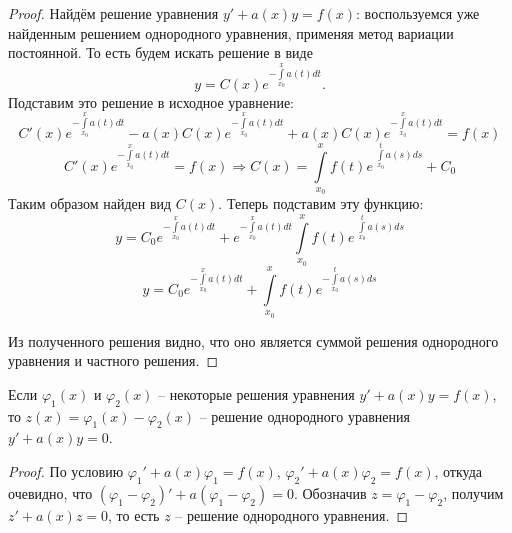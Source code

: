 \begin{proof}
    Найдём решение уравнения $y' + a(x) y = f(x)$: воспользуемся уже найденным решением однородного уравнения, применяя метод вариации постоянной. То есть будем искать решение в виде
    \begin{equation}
        y = C(x) e^{-\int\limits_{x_0}^{x} a(t) dt}.
    \end{equation}
    Подставим это решение в исходное уравнение:
    \begin{equation}
        C'(x) e^{-\int\limits_{x_0}^{x} a(t) dt} - a(x) C(x) e^{-\int\limits_{x_0}^{x} a(t) dt} + a(x) C(x) e^{-\int\limits_{x_0}^{x} a(t) dt} = f(x)
    \end{equation}
    \begin{equation}
        C'(x) e^{-\int\limits_{x_0}^{x} a(t) dt} = f(x) \Rightarrow C(x) = \int\limits_{x_0}^{x} f(t) e^{\; \int\limits_{x_0}^{t} a(s) ds} + C_0
    \end{equation}
    Таким образом найден вид $C(x)$. Теперь подставим эту функцию:
    \begin{equation}
        y = C_0 e^{-\int\limits_{x_0}^{x} a(t) dt} + e^{-\int\limits_{x_0}^{x} a(t) dt} \int\limits_{x_0}^{x} f(t) e^{\; \int\limits_{x_0}^{t} a(s) ds}
    \end{equation}
    \begin{equation}
        y = C_0 e^{-\int\limits_{x_0}^{x} a(t) dt} + \int\limits_{x_0}^{x} f(t) e^{- \int\limits_{x_0}^{t} a(s) ds}
    \end{equation}
    
    Из полученного решения видно, что оно является суммой решения однородного уравнения и частного решения. 
\end{proof}

\begin{proposition}
    Если $\varphi_1(x)$ и $\varphi_2(x)$ -- некоторые решения уравнения $y' + a(x) y = f(x)$, то $z(x) = \varphi_1(x) - \varphi_2(x)$ -- решение однородного уравнения $y' + a(x) y = 0$.
\end{proposition}

\begin{proof}
    По условию $\varphi_1' + a(x) \varphi_1 = f(x)$, $\varphi_2' + a(x) \varphi_2 = f(x)$, откуда очевидно, что $(\varphi_1 - \varphi_2)' + a (\varphi_1 - \varphi_2) = 0$. Обозначив $z = \varphi_1 - \varphi_2$, получим $z' + a(x) z = 0$, то есть $z$ -- решение однородного уравнения.
\end{proof}
